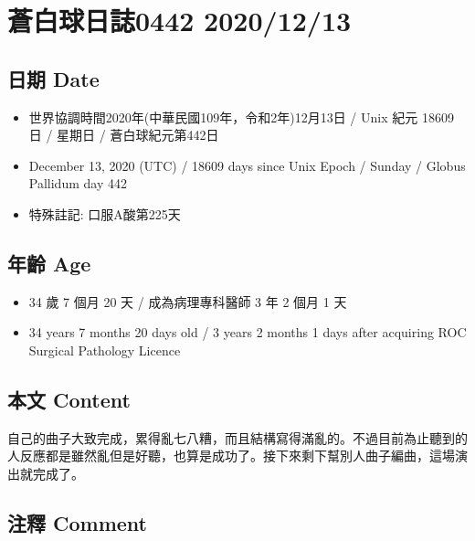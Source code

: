 \documentclass[a5paper, 10pt
]{book}
\providecommand{\tightlist}{%
  \setlength{\itemsep}{0pt}\setlength{\parskip}{0pt}}
\begin{document}
\hypertarget{ux84bcux767dux7403ux65e5ux8a8c0442-20201213}{%
\section{蒼白球日誌0442
2020/12/13}\label{ux84bcux767dux7403ux65e5ux8a8c0442-20201213}}

\hypertarget{ux65e5ux671f-date-12}{%
\subsection{日期 Date}\label{ux65e5ux671f-date-12}}

\begin{itemize}
\tightlist
\item
  世界協調時間2020年(中華民國109年，令和2年)12月13日 / Unix 紀元 18609
  日 / 星期日 / 蒼白球紀元第442日
\item
  December 13, 2020 (UTC) / 18609 days since Unix Epoch / Sunday /
  Globus Pallidum day 442
\item
  特殊註記: 口服A酸第225天
\end{itemize}

\hypertarget{ux5e74ux9f61-age-12}{%
\subsection{年齡 Age}\label{ux5e74ux9f61-age-12}}

\begin{itemize}
\tightlist
\item
  34 歲 7 個月 20 天 / 成為病理專科醫師 3 年 2 個月 1 天
\item
  34 years 7 months 20 days old / 3 years 2 months 1 days after
  acquiring ROC Surgical Pathology Licence
\end{itemize}

\hypertarget{ux672cux6587-content-12}{%
\subsection{本文 Content}\label{ux672cux6587-content-12}}

自己的曲子大致完成，累得亂七八糟，而且結構寫得滿亂的。不過目前為止聽到的人反應都是雖然亂但是好聽，也算是成功了。接下來剩下幫別人曲子編曲，這場演出就完成了。

\hypertarget{ux6ce8ux91cb-comment-12}{%
\subsection{注釋 Comment}\label{ux6ce8ux91cb-comment-12}}
\end{document}
